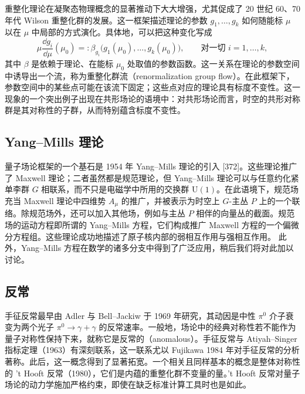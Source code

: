重整化理论在凝聚态物理概念的显著推动下大大增强，尤其促成了 20 世纪 60、70 年代 Wilson 重整化群的发展。这一框架描述理论的参数 $g_1,\dots,g_k$ 如何随能标 $\mu$ 以在 $\mu$ 中局部的方式演化。具体地，可以把这种变化写成
\[
\mu\frac{\dd g_i}{\dd\mu}(\mu_0)=:\beta_{g_i}\bigl(g_1(\mu_0),\dots,g_k(\mu_0)\bigr),\qquad \text{对一切 } i=1,\dots,k,
\]
其中 $\beta$ 是依赖于理论、在能标 $\mu_0$ 处取值的参数函数。这一关系在理论的参数空间中诱导出一个流，称为重整化群流（renormalization group flow）。在此框架下，参数空间中的某些点可能在该流下固定；这些点对应的理论具有标度不变性。这一现象的一个突出例子出现在共形场论的语境中：对共形场论而言，时空的共形对称群是其对称性的子群，从而特别蕴含标度不变性。


\subsection*{Yang--Mills 理论}

量子场论框架的一个基石是 1954 年 Yang--Mills 理论的引入 [372]。这些理论推广了 Maxwell 理论；二者虽然都是规范理论，但 Yang--Mills 理论可以与任意约化紧单李群 $G$ 相联系，而不只是电磁学中所用的交换群 $\mathrm{U}(1)$。在此语境下，规范场充当 Maxwell 理论中四维势 $A_\mu$ 的推广，并被表示为时空上 $G$-主丛 $P$ 上的一个联络。除规范场外，还可以加入其他场，例如与主丛 $P$ 相伴的向量丛的截面。规范场的运动方程即所谓的 Yang--Mills 方程，它们构成推广 Maxwell 方程的一个偏微分方程组。这些理论成功地描述了原子核内部的弱相互作用与强相互作用。
此外，Yang--Mills 方程在数学的诸多分支中得到了广泛应用，稍后我们将对此加以讨论。


\subsection*{反常}

手征反常最早由 Adler 与 Bell--Jackiw 于 1969 年研究，其动因是中性 $\pi^0$ 介子衰变为两个光子 $\pi^0\to\gamma+\gamma$ 的反常速率。一般地，场论中的经典对称性若不能作为量子对称性保持下来，就称它是反常的（anomalous）。手征反常与 Atiyah--Singer 指标定理（1963）有深刻联系，这一联系尤以 Fujikawa 1984 年对手征反常的分析著称。此后，这一概念得到了显著拓宽。一个相关且同样基本的概念是整体对称性的 't Hooft 反常（1980），它们是内蕴的重整化群不变量的量。't Hooft 反常对量子场论的动力学施加严格约束，即使在缺乏标准计算工具时也是如此。

